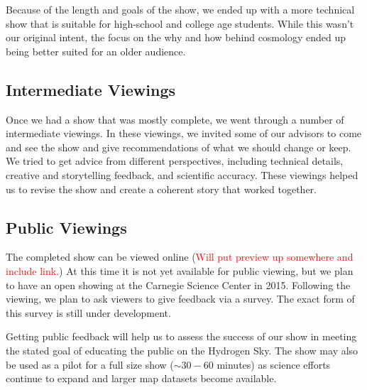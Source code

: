 Because of the length and goals of the show, we ended up with a more technical show that is suitable for high-school and college age students. While this wasn't our original intent, the focus on the why and how behind \cm cosmology ended up being better suited for an older audience. 


\subsection{Intermediate Viewings}

Once we had a show that was mostly complete, we went through a number of intermediate viewings. In these viewings, we invited some of our advisors to come and see the show and give recommendations of what we should change or keep. We tried to get advice from different perspectives, including technical details, creative and storytelling feedback, and scientific accuracy. These viewings helped us to revise the show and create a coherent story that worked together. 


\subsection{Public Viewings}

The completed show can be viewed online (\textcolor{red}{Will put preview up somewhere and include link.}) At this time it is not yet available for public viewing, but we plan to have an open showing at the Carnegie Science Center in 2015. Following the viewing, we plan to ask viewers to give feedback via a survey. The exact form of this survey is still under development. 

Getting public feedback will help us to assess the success of our show in meeting the stated goal of educating the public on the Hydrogen Sky. The show may also be used as a pilot for a full size show ($\sim 30-60$ minutes) as \cm science efforts continue to expand and larger \cm map datasets become available. 